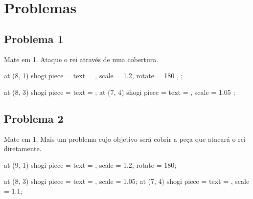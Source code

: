 \documentclass[14pt]{extarticle}
\renewcommand{\_}{\leavevmode\kern.06em\vbox{\hrule width.425em}}
\newenvironment{shogiBigProblem}[1][]{%
  \hbox\bgroup
    \hspace{-1.5cm}
    \begin{shogiban}[%
      board dimension = 12.5 cm,
      font scale = 2.5,
      #1,
    ]
}{
    \end{shogiban}
  \egroup
}
\begin{document}
  \section{Problemas}
  
  \subsection{Problema 1}
  

  \vspace{0.5cm}

  Mate em 1. Ataque o rei através de uma cobertura.

  \vspace{1.5cm}

  \begin{shogiBigProblem}
    \pic at (8, 1) {%
      shogi piece = {%
        text = \shogiKingGote,
        scale = 1.2,
        rotate = 180
      },
    };

    \pic at (8, 3) {%
      shogi piece = {%
        text = \shogiPawn
      }
    };
    \pic at (7, 4) {%
      shogi piece = {%
        text = \shogiKnight,
        scale = 1.05
      }
    };
  \end{shogiBigProblem}
  
  \pagebreak

  \subsection{Problema 2}


  \vspace{0.5cm}

  Mate em 1. Mais um problema cujo objetivo será cobrir a peça que atacará o rei diretamente.

  \vspace{1.5cm}

  \begin{shogiBigProblem}
    \pic at (9, 1) {shogi piece = {text = \shogiKingGote, scale = 1.2, rotate = 180}};

    \pic at (8, 3) {shogi piece = {text = \shogiSilver, scale = 1.05}};
    \pic at (7, 4) {shogi piece = {text = \shogiBishop, scale = 1.1}};
  \end{shogiBigProblem}
  
\end{document}

